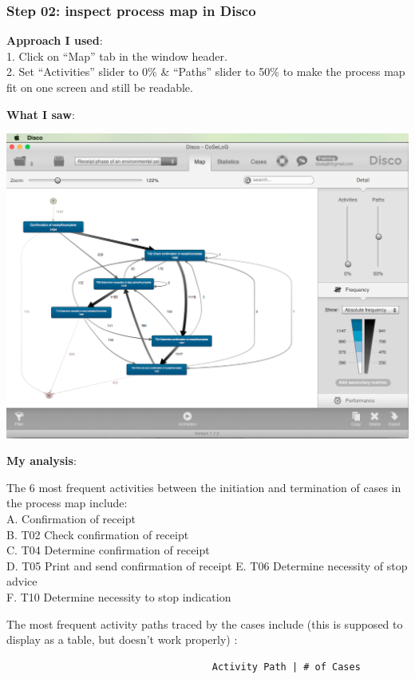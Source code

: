 \documentclass[]{article}
\begin{document}
\subsubsection{Step 02: inspect process map in
Disco}\label{step-02-inspect-process-map-in-disco}

\textbf{Approach I used}:\\1. Click on ``Map'' tab in the window
header.\\2. Set ``Activities'' slider to 0\% \& ``Paths'' slider to 50\%
to make the process map fit on one screen and still be readable.

\textbf{What I saw}:

\includegraphics{CoSeLoG_Step_02.png}

\textbf{My analysis}:

The 6 most frequent activities between the initiation and termination of
cases in the process map include:\\A. Confirmation of receipt\\B. T02
Check confirmation of receipt\\C. T04 Determine confirmation of
receipt\\D. T05 Print and send confirmation of receipt E. T06 Determine
necessity of stop advice\\F. T10 Determine necessity to stop indication

The most frequent activity paths traced by the cases include (this is
supposed to display as a table, but doesn't work properly) :

\begin{verbatim}
                                    Activity Path | # of Cases  
\end{verbatim}
\end{document}
